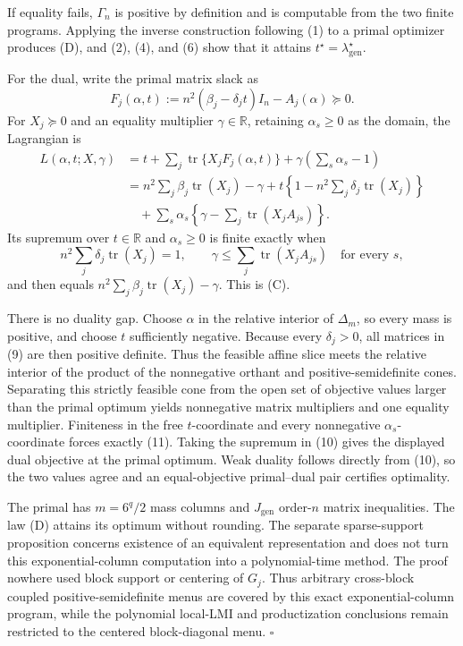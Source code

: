 If equality fails, \(\Gamma_n\) is positive by definition and is computable from the two finite programs. Applying the inverse construction following (1) to a primal optimizer produces (D), and (2), (4), and (6) show that it attains \(t^\star=\lambda_{\mathrm{gen}}^\star\).

For the dual, write the primal matrix slack as
\[
F_j(\alpha,t)
:=n^2(\beta_j-\delta_jt)I_n-A_j(\alpha)\succeq0.
\tag{9}
\]
For \(X_j\succeq0\) and an equality multiplier \(\gamma\in\mathbb R\), retaining \(\alpha_s\ge0\) as the domain, the Lagrangian is
\[
\begin{aligned}
L(\alpha,t;X,\gamma)
&=t+\sum_j\operatorname{tr}\{X_jF_j(\alpha,t)\}
+\gamma\left(\sum_s\alpha_s-1\right)\\
&=n^2\sum_j\beta_j\operatorname{tr}(X_j)-\gamma
+t\left\{1-n^2\sum_j\delta_j\operatorname{tr}(X_j)\right\}\\
&\quad+\sum_s\alpha_s
\left\{\gamma-\sum_j\operatorname{tr}(X_jA_{js})\right\}.
\end{aligned}
\tag{10}
\]
Its supremum over \(t\in\mathbb R\) and \(\alpha_s\ge0\) is finite exactly when
\[
n^2\sum_j\delta_j\operatorname{tr}(X_j)=1,
\qquad
\gamma\le\sum_j\operatorname{tr}(X_jA_{js})
\quad\text{for every }s,
\tag{11}
\]
and then equals \(n^2\sum_j\beta_j\operatorname{tr}(X_j)-\gamma\). This is (C).

There is no duality gap. Choose \(\alpha\) in the relative interior of \(\Delta_m\), so every mass is positive, and choose \(t\) sufficiently negative. Because every \(\delta_j>0\), all matrices in (9) are then positive definite. Thus the feasible affine slice meets the relative interior of the product of the nonnegative orthant and positive-semidefinite cones. Separating this strictly feasible cone from the open set of objective values larger than the primal optimum yields nonnegative matrix multipliers and one equality multiplier. Finiteness in the free \(t\)-coordinate and every nonnegative \(\alpha_s\)-coordinate forces exactly (11). Taking the supremum in (10) gives the displayed dual objective at the primal optimum. Weak duality follows directly from (10), so the two values agree and an equal-objective primal--dual pair certifies optimality.

The primal has \(m=6^q/2\) mass columns and \(J_{\mathrm{gen}}\) order-\(n\) matrix inequalities. The law (D) attains its optimum without rounding. The separate sparse-support proposition concerns existence of an equivalent representation and does not turn this exponential-column computation into a polynomial-time method. The proof nowhere used block support or centering of \(G_j\). Thus arbitrary cross-block coupled positive-semidefinite menus are covered by this exact exponential-column program, while the polynomial local-LMI and productization conclusions remain restricted to the centered block-diagonal menu. \(\square\)